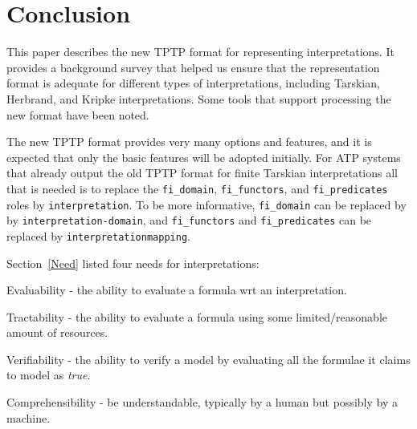 \documentclass{easychair}
\newenvironment{packed_itemize}{
\vspace*{-0.3em}
\begin{itemize}
\setlength{\partopsep}{0pt}
\setlength{\itemsep}{1pt}
\setlength{\parskip}{0pt}
\setlength{\parsep}{0pt}
}{\end{itemize}}
\begin{document}
\section{Conclusion}
\label{Conclusion}

This paper describes the new TPTP format for representing interpretations.
It provides a background survey that helped us ensure that the representation format is adequate
for different types of interpretations, including Tarskian, Herbrand, and Kripke interpretations.
Some tools that support processing the new format have been noted.

The new TPTP format provides very many options and features, and it is expected that only the 
basic features will be adopted initially. 
For ATP systems that already output the old TPTP format for finite Tarskian interpretations
all that is needed is to replace the {\tt fi\_domain}, {\tt fi\_functors}, and {\tt fi\_predicates}
roles by {\tt interpretation}. 
To be more informative, {\tt fi\_domain} can be replaced by by {\tt interpretation-domain}, and 
{\tt fi\_functors} and {\tt fi\_predicates} can be replaced by {\tt interpretation\-mapping}.

Section~\ref{Need} listed four needs for interpretations: 
\begin{packed_itemize}
\item Evaluability - the ability to evaluate a formula wrt an interpretation.
\item Tractability - the ability to evaluate a formula using some limited/reasonable amount of
      resources.
\item Verifiability - the ability to verify a model by evaluating all the formulae it claims
      to model as \textit{true}.
\item Comprehensibility - be understandable, typically by a human but possibly by a machine.
\end{packed_itemize}
\end{document}
